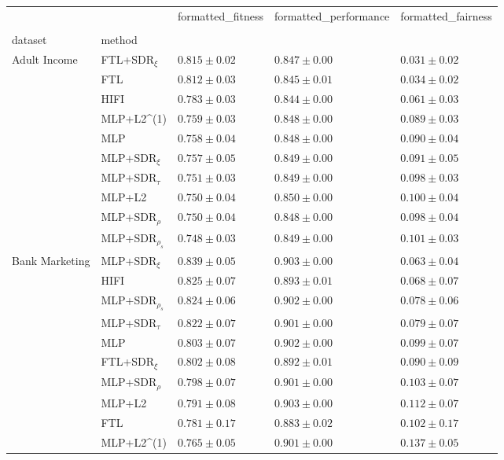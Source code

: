 \begin{tabular}{lllll}
\toprule
 &  & formatted_fitness & formatted_performance & formatted_fairness \\
 &  &  &  &  \\
dataset & method &  &  &  \\
\midrule
\multirow[t]{10}{*}{Adult Income} & FTL+SDR$_{\xi}$ & $0.815 \pm0.02$ & $0.847 \pm0.00$ & $0.031 \pm0.02$ \\
 & FTL & $0.812 \pm0.03$ & $0.845 \pm0.01$ & $0.034 \pm0.02$ \\
 & HIFI & $0.783 \pm0.03$ & $0.844 \pm0.00$ & $0.061 \pm0.03$ \\
 & MLP+L2^{(1)} & $0.759 \pm0.03$ & $0.848 \pm0.00$ & $0.089 \pm0.03$ \\
 & MLP & $0.758 \pm0.04$ & $0.848 \pm0.00$ & $0.090 \pm0.04$ \\
 & MLP+SDR$_{\xi}$ & $0.757 \pm0.05$ & $0.849 \pm0.00$ & $0.091 \pm0.05$ \\
 & MLP+SDR$_{\tau}$ & $0.751 \pm0.03$ & $0.849 \pm0.00$ & $0.098 \pm0.03$ \\
 & MLP+L2 & $0.750 \pm0.04$ & $0.850 \pm0.00$ & $0.100 \pm0.04$ \\
 & MLP+SDR$_{\rho}$ & $0.750 \pm0.04$ & $0.848 \pm0.00$ & $0.098 \pm0.04$ \\
 & MLP+SDR$_{\rho_s}$ & $0.748 \pm0.03$ & $0.849 \pm0.00$ & $0.101 \pm0.03$ \\
\cline{1-5}
\multirow[t]{10}{*}{Bank Marketing} & MLP+SDR$_{\xi}$ & $0.839 \pm0.05$ & $0.903 \pm0.00$ & $0.063 \pm0.04$ \\
 & HIFI & $0.825 \pm0.07$ & $0.893 \pm0.01$ & $0.068 \pm0.07$ \\
 & MLP+SDR$_{\rho_s}$ & $0.824 \pm0.06$ & $0.902 \pm0.00$ & $0.078 \pm0.06$ \\
 & MLP+SDR$_{\tau}$ & $0.822 \pm0.07$ & $0.901 \pm0.00$ & $0.079 \pm0.07$ \\
 & MLP & $0.803 \pm0.07$ & $0.902 \pm0.00$ & $0.099 \pm0.07$ \\
 & FTL+SDR$_{\xi}$ & $0.802 \pm0.08$ & $0.892 \pm0.01$ & $0.090 \pm0.09$ \\
 & MLP+SDR$_{\rho}$ & $0.798 \pm0.07$ & $0.901 \pm0.00$ & $0.103 \pm0.07$ \\
 & MLP+L2 & $0.791 \pm0.08$ & $0.903 \pm0.00$ & $0.112 \pm0.07$ \\
 & FTL & $0.781 \pm0.17$ & $0.883 \pm0.02$ & $0.102 \pm0.17$ \\
 & MLP+L2^{(1)} & $0.765 \pm0.05$ & $0.901 \pm0.00$ & $0.137 \pm0.05$ \\

\end{tabular}
